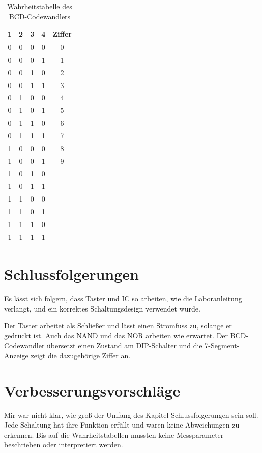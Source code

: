 \documentclass[
    paper=a4,
]{scrartcl}
\newcommand{\quoteenv}[1]{\glqq #1\grqq}
\begin{document}
    \begin{table}
        \centering
        \caption{Wahrheitstabelle des BCD-Codewandlers}
        \label{tab:3}
        \begin{tabular}{cccc|c}\toprule
            1   &   2   &   3   &   4   &   Ziffer\\\midrule
            0   &   0   &   0   &   0   &   0\\
            0   &   0   &   0   &   1   &   1\\
            0   &   0   &   1   &   0   &   2\\
            0   &   0   &   1   &   1   &   3\\
            0   &   1   &   0   &   0   &   4\\
            0   &   1   &   0   &   1   &   5\\
            0   &   1   &   1   &   0   &   6\\
            0   &   1   &   1   &   1   &   7\\
            1   &   0   &   0   &   0   &   8\\
            1   &   0   &   0   &   1   &   9\\\midrule
            1   &   0   &   1   &   0   &   \\
            1   &   0   &   1   &   1   &   \\
            1   &   1   &   0   &   0   &   \\
            1   &   1   &   0   &   1   &   \\
            1   &   1   &   1   &   0   &   \\
            1   &   1   &   1   &   1   &   \\\bottomrule
        \end{tabular}
    \end{table}

\section{Schlussfolgerungen}
    Es lässt sich folgern, dass Taster und IC so arbeiten, wie die Laboranleitung verlangt, und ein korrektes Schaltungsdesign verwendet wurde.   

    Der Taster arbeitet als Schließer und lässt einen Stromfuss zu, solange er gedrückt ist. Auch das NAND und das NOR arbeiten wie erwartet. Der BCD-Codewandler übersetzt einen Zustand am DIP-Schalter und die 7-Segment-Anzeige zeigt die dazugehörige Ziffer an. 

\section{Verbesserungsvorschläge}
    Mir war nicht klar, wie groß der Umfang des Kapitel \quoteenv{Schlussfolgerungen} sein soll. Jede Schaltung hat ihre Funktion erfüllt und waren keine Abweichungen zu erkennen. Bis auf die Wahrheitstabellen mussten keine Messparameter beschrieben oder interpretiert werden.
\end{document}
